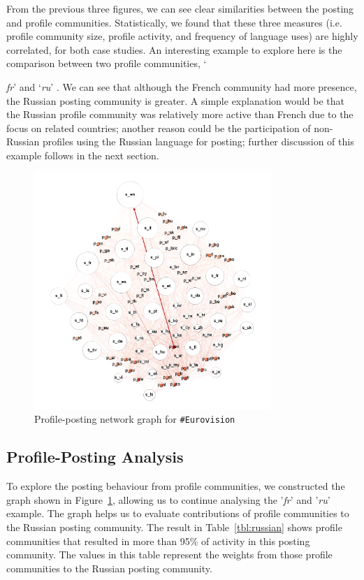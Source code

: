 \documentclass{llncs}
\begin{document}
From the previous three figures, we can see clear similarities between
the posting and profile communities. Statistically, we found that
these three measures (i.e. profile community size, profile activity,
and frequency of language uses) are highly correlated, for both case
studies. An interesting example to explore here is the comparison
between two profile communities, `{\emph{fr}' and `{\emph{ru}}' .  We
can see that although the French community had more presence, the
Russian posting community is greater. A simple explanation would be
that the Russian profile community was relatively more active than
French due to the focus on related countries; another reason could be
the participation of non-Russian profiles using the Russian language
for posting; further discussion of this example follows in the next
section.

\begin{figure}[!htb]
\centering
\includegraphics[width=0.8\textwidth]{images/euro_pslang.png}
\caption{Profile-posting network graph for {\texttt{\#Eurovision}}}
\label{fig:eurovisionpslang}
\end{figure}

\subsection{Profile-Posting Analysis}\label{eurovisionppanalysis}

To explore the posting behaviour from profile communities, we
constructed the graph shown in Figure~\ref{fig:eurovisionpslang},
allowing us to continue analysing the '{\emph{fr}}' and '{\emph{ru}}'
example.  The graph helps us to evaluate contributions of profile
communities to the Russian posting community.  The result in
Table~\ref{tbl:russian} shows profile communities that resulted in
more than 95\% of activity in this posting community. The values in
this table represent the weights from those profile communities to the
Russian posting community.

}
\end{document}
